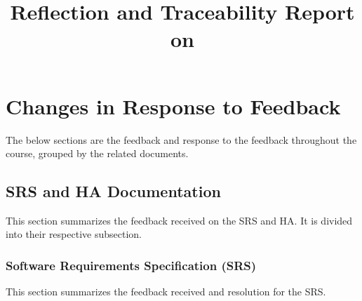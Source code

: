 \documentclass{article}
\title{Reflection and Traceability Report on \progname}
\author{\authname}
\date{}
\begin{document}
\maketitle

\section{Changes in Response to Feedback}
The below sections are the feedback and response to the feedback throughout the course, grouped by the related documents.

\subsection{SRS and HA Documentation}
This section summarizes the feedback received on the SRS and HA. It is divided into their respective subsection.

\subsubsection{Software Requirements Specification (SRS)}
    This section summarizes the feedback received and resolution for the SRS.
\end{document}
